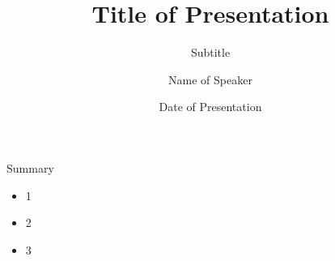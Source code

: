 \documentclass[aspectratio=169]{beamer}
\title[Short Title]{Title of Presentation}
\subtitle{Subtitle}
\author{Name of Speaker}
\institute{Job Title or Affiliation}
\date{Date of Presentation}
\begin{document}
	
	
{
%
\begin{frame}
\end{frame}
}
\titlepage

\begin{frame}{Summary}
\begin{itemize}
\item 1
\item 2
\item 3
\end{itemize}
\end{frame}


{
	\begin{frame}
\end{frame}
}
\end{document}
